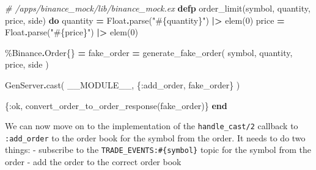 \documentclass[
  oneside]{book}
\newenvironment{Shaded}{\begin{snugshade}}{\end{snugshade}}
\newcommand{\CommentTok}[1]{\textcolor[rgb]{0.56,0.35,0.01}{\textit{#1}}}
\newcommand{\ConstantTok}[1]{\textcolor[rgb]{0.00,0.00,0.00}{#1}}
\newcommand{\DecValTok}[1]{\textcolor[rgb]{0.00,0.00,0.81}{#1}}
\newcommand{\KeywordTok}[1]{\textcolor[rgb]{0.13,0.29,0.53}{\textbf{#1}}}
\newcommand{\NormalTok}[1]{#1}
\newcommand{\OperatorTok}[1]{\textcolor[rgb]{0.81,0.36,0.00}{\textbf{#1}}}
\newcommand{\OtherTok}[1]{\textcolor[rgb]{0.56,0.35,0.01}{#1}}
\newcommand{\StringTok}[1]{\textcolor[rgb]{0.31,0.60,0.02}{#1}}
\newcommand{\VariableTok}[1]{\textcolor[rgb]{0.00,0.00,0.00}{#1}}
\begin{document}
\begin{Shaded}
\begin{Highlighting}[]
\CommentTok{\# /apps/binance\_mock/lib/binance\_mock.ex}
  \KeywordTok{defp}\NormalTok{ order\_limit(symbol, quantity, price, side) }\KeywordTok{do}
\NormalTok{    quantity }\OperatorTok{=} \ConstantTok{Float}\OperatorTok{.}\NormalTok{parse(}\StringTok{"}\OtherTok{\#\{}\NormalTok{quantity}\OtherTok{\}}\StringTok{"}\NormalTok{) }\OperatorTok{|\textgreater{}}\NormalTok{ elem(}\DecValTok{0}\NormalTok{)}
\NormalTok{    price }\OperatorTok{=} \ConstantTok{Float}\OperatorTok{.}\NormalTok{parse(}\StringTok{"}\OtherTok{\#\{}\NormalTok{price}\OtherTok{\}}\StringTok{"}\NormalTok{) }\OperatorTok{|\textgreater{}}\NormalTok{ elem(}\DecValTok{0}\NormalTok{)}

\NormalTok{    \%}\ConstantTok{Binance}\OperatorTok{.}\ConstantTok{Order}\NormalTok{\{\} }\OperatorTok{=}
\NormalTok{      fake\_order }\OperatorTok{=}
\NormalTok{      generate\_fake\_order(}
\NormalTok{        symbol,}
\NormalTok{        quantity,}
\NormalTok{        price,}
\NormalTok{        side}
\NormalTok{      )}

    \ConstantTok{GenServer}\OperatorTok{.}\NormalTok{cast(}
      \ConstantTok{\_\_MODULE\_\_}\NormalTok{,}
\NormalTok{      \{}\VariableTok{:add\_order}\NormalTok{, fake\_order\}}
\NormalTok{    )}

\NormalTok{    \{}\VariableTok{:ok}\NormalTok{, convert\_order\_to\_order\_response(fake\_order)\}}
  \KeywordTok{end}
\end{Highlighting}
\end{Shaded}

We can now move on to the implementation of the \texttt{handle\_cast/2} callback to \texttt{:add\_order} to the order book for the symbol from the order.
It needs to do two things:
- subscribe to the \texttt{TRADE\_EVENTS:\#\{symbol\}} topic for the symbol from
the order
- add the order to the correct order book
\end{document}
